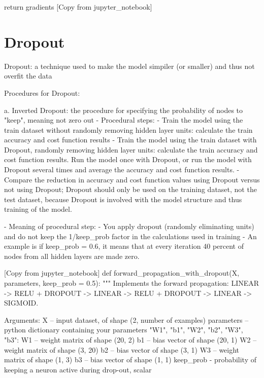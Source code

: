 \documentclass[11pt, onecolumn]{article}
\begin{document}
    return gradients
[Copy from jupyter_notebook]



\section{Dropout}

Dropout: a technique used to make the model simpiler (or smaller) and thus not overfit the data

Procedures for Dropout:

a. Inverted Dropout: the procedure for specifying the probability of nodes to "keep", meaning not zero out
	- Procedural steps:
		- Train the model using the train dataset without randomly removing hidden layer units: calculate the train accuracy and cost function results
		- Train the model using the train dataset with Dropout, randomly removing hidden layer units: calculate the train accuracy and cost function results. Run the model once with Dropout, or run the model with Dropout several times and average the accuracy and cost function results.
		- Compare the reduction in accuracy and cost function values using Dropout versus not using Dropout; Dropout should only be used on the training dataset, not the test dataset, because Dropout is involved with the model structure and thus training of the model. 
		
		
	- Meaning of procedural step:
		- You apply dropout (randomly eliminating units) and do not keep the 1/keep_prob factor in the calculations used in training
		- An example is if keep_prob = 0.6, it means that at every iteration 40 percent of nodes from all hidden layers are made zero.

[Copy from jupyter_notebook]
def forward_propagation_with_dropout(X, parameters, keep_prob = 0.5):
    """
    Implements the forward propagation: LINEAR -> RELU + DROPOUT -> LINEAR -> RELU + DROPOUT -> LINEAR -> SIGMOID.
    
    Arguments:
    X -- input dataset, of shape (2, number of examples)
    parameters -- python dictionary containing your parameters "W1", "b1", "W2", "b2", "W3", "b3":
                    W1 -- weight matrix of shape (20, 2)
                    b1 -- bias vector of shape (20, 1)
                    W2 -- weight matrix of shape (3, 20)
                    b2 -- bias vector of shape (3, 1)
                    W3 -- weight matrix of shape (1, 3)
                    b3 -- bias vector of shape (1, 1)
    keep_prob - probability of keeping a neuron active during drop-out, scalar
    
\end{document}
